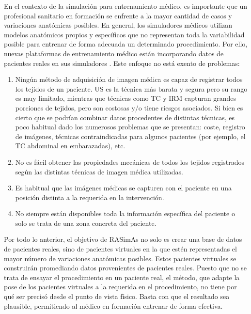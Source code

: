 En el contexto de la simulación para entrenamiento médico, es importante que un profesional sanitario en formación se enfrente a la mayor cantidad de casos y  variaciones anatómicas posibles. En general, los simuladores médicos utilizan modelos anatómicos propios y específicos que no representan toda la variabilidad posible para entrenar de forma adecuada un determinado procedimiento. 
Por ello, nuevas plataformas de entrenamiento médico están incorporando datos de pacientes reales en sus simuladores \cite{Willaert2012,Votta2013}. Este enfoque no está exento de problemas:
\begin{enumerate}
    \item Ningún método de adquisición de imagen médica es capaz de registrar todos los tejidos de un paciente.
    \ac{US} es la técnica más barata y segura pero su rango es muy limitado, mientras que técnicas como \ac{TC} y \ac{IRM} capturan grandes porciones de tejidos, pero son costosas y/o tiene riesgos asociados. 
    Si bien es cierto que se podrían combinar datos procedentes de distintas técnicas, es poco habitual dado  los numerosos problemas que se presentan: coste, registro de imágenes, técnicas contraindicadas para algunos pacientes (por ejemplo, el \ac{TC} abdominal en embarazadas), etc.
    \item No es fácil obtener las propiedades mecánicas  de todos los tejidos registrados según las distintas técnicas de imagen médica utilizadas.
    \item Es habitual que las imágenes médicas se capturen con el paciente en una posición distinta a la requerida en la intervención.
    \item No siempre están disponibles toda la información específica del paciente o solo se trata de una zona concreta del paciente.
\end{enumerate}
%
Por todo lo anterior, el objetivo de \ac{RASimAs} no solo es crear una base de datos de pacientes reales, sino de pacientes virtuales en la que estén representadas el mayor número de variaciones anatómicas posibles. Estos pacientes virtuales se construirán promediando datos provenientes de pacientes reales. Puesto que no se trata de ensayar el procedimiento en un paciente real, el método, que adapte la pose de los pacientes virtuales a la requerida en el procedimiento, no tiene por qué ser precisó desde el punto de vista físico. Basta con que el resultado sea plausible, permitiendo al médico en formación entrenar de forma efectiva.
